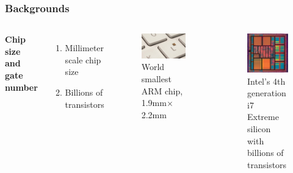 \documentclass{beamer}
\begin{document}
\begin{frame}
  \frametitle{Backgrounds}
  \begin{columns}[c] %

    \textbf{Chip size and gate number}
    \begin{enumerate}
    \item Millimeter scale chip size
    \item Billions of transistors
    \end{enumerate}
    \begin{figure}
      \centering
      \includegraphics[width=0.9\linewidth]{chip_size}
      \caption{World smallest ARM chip, 1.9mm$\times$2.2mm}
    \end{figure}

    \begin{figure}
      \centering
      \includegraphics[width=0.9\linewidth]{chip_gates}
      \caption{Intel's 4th generation i7 Extreme silicon with billions of transistors}
    \end{figure}

  \end{columns}
\end{frame}
\end{document}
